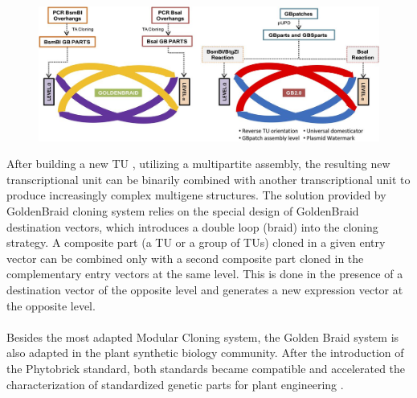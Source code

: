 \begin{figure}[!htbp]
    \centering
    \includegraphics[width=\textwidth]{images/chap4/chap4_gb_01.png}
    \label{fig:ch4gb01}
\end{figure}
\FloatBarrier
\noindent
After building a new TU , utilizing a multipartite assembly, the resulting new transcriptional unit can be binarily combined with another transcriptional unit to produce increasingly complex multigene structures. The solution provided by GoldenBraid cloning system relies on the special design of GoldenBraid destination vectors, which introduces a double loop (braid) into the cloning strategy. A composite part (a TU or a group of TUs) cloned in a given entry vector can be combined only with a second composite part cloned in the complementary entry vectors at the same level. This is done in the presence of a destination vector of the opposite level and generates a new expression vector at the opposite level. \\ \\
Besides the most adapted Modular Cloning system, the Golden Braid system is also adapted in the plant synthetic biology community. After the introduction of the Phytobrick standard, both standards became compatible and accelerated the characterization of standardized genetic parts for plant engineering \parencite{Sarrion-Perdigones2013}.
